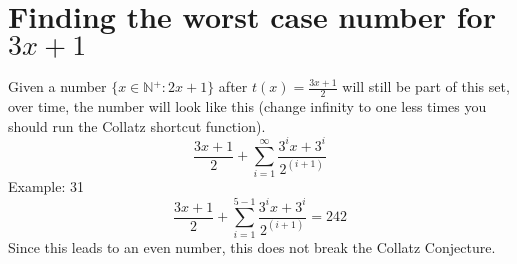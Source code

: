 \documentclass[a4paper,10pt]{article}
\begin{document}
  \section{Finding the worst case number for $3x+1$}
  Given a number \(\{x \in \mathbb{N{^+}}: 2x + 1\}\) after \(t(x) = \frac{3x+1}{2}\) will still be part of this set, over time, the number will look like this (change infinity to one less times you should run the Collatz shortcut function).
  \[
     \frac{3x+1}{2}+\sum_{i=1}^{\infty} \frac{3^{i}x+3^{i}}{2^{(i+1)}}
  \]
  Example: 31
  \[
     \frac{3x+1}{2}+\sum_{i=1}^{5-1} \frac{3^{i}x+3^{i}}{2^{(i+1)}} = 242
  \]
  Since this leads to an even number, this does not break the Collatz Conjecture.
\end{document}
